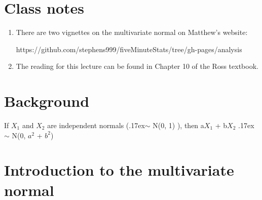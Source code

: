 \documentclass[12pt]{report}
\begin{document}

\maketitle

\vspace*{.1in}



\section{Class notes}

\begin{enumerate}

\item There are two vignettes on the multivariate normal on Matthew's website: 

https://github.com/stephens999/fiveMinuteStats/tree/gh-pages/analysis
\item The reading for this lecture can be found in Chapter 10 of the Ross textbook. 

\end{enumerate}

\section{Background}

If $X_{1}$ and $X_{2}$ are independent normals ({\raise.17ex\hbox{$\scriptstyle\sim$}} N(0, 1) ), then a$X_{1}$ + b$X_{2}$ {\raise.17ex\hbox{$\scriptstyle\sim$}} N(0, $a^{2}$ + $b^{2}$)

\section{Introduction to the multivariate normal}
\end{document}
